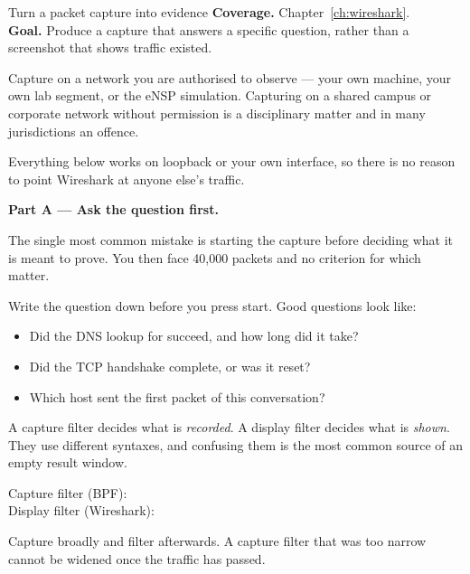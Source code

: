 
\begin{labproject}{Turn a packet capture into evidence}
\textbf{Coverage.} Chapter~\ref{ch:wireshark}.\\
\textbf{Goal.} Produce a capture that answers a specific question, rather than a screenshot that shows traffic existed.

\begin{labmode}
Capture on a network you are authorised to observe --- your own machine, your own lab segment, or the eNSP simulation. Capturing on a shared campus or corporate network without permission is a disciplinary matter and in many jurisdictions an offence.

Everything below works on loopback or your own interface, so there is no reason to point Wireshark at anyone else's traffic.
\end{labmode}

\medskip\noindent\textbf{Part A --- Ask the question first.}\par
The single most common mistake is starting the capture before deciding what it is meant to prove. You then face 40{,}000 packets and no criterion for which matter.

Write the question down before you press start. Good questions look like:

\begin{itemize}
  \item Did the DNS lookup for  succeed, and how long did it take?
  \item Did the TCP handshake complete, or was it reset?
  \item Which host sent the first packet of this conversation?
\end{itemize}

\begin{keyidea}
A capture filter decides what is \emph{recorded}. A display filter decides what is \emph{shown}. They use different syntaxes, and confusing them is the most common source of an empty result window.

Capture filter (BPF): \\
Display filter (Wireshark): 

Capture broadly and filter afterwards. A capture filter that was too narrow cannot be widened once the traffic has passed.
\end{keyidea}


\end{labproject}
